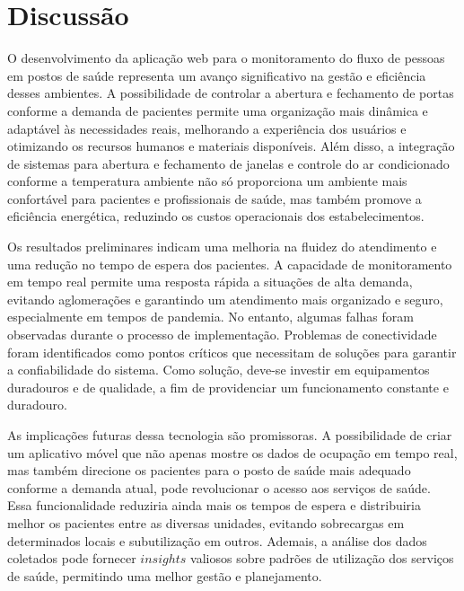 \documentclass[conference, a4paper, 12pt]{IEEEtran}
\begin{document}
\section{Discussão}
\label{sec:discussion}
  O desenvolvimento da aplicação web para o monitoramento do fluxo de pessoas em postos de saúde representa um avanço significativo na gestão e eficiência desses ambientes. A possibilidade de controlar a abertura e fechamento de portas conforme a demanda de pacientes permite uma organização mais dinâmica e adaptável às necessidades reais, melhorando a experiência dos usuários e otimizando os recursos humanos e materiais disponíveis. Além disso, a integração de sistemas para abertura e fechamento de janelas e controle do ar condicionado conforme a temperatura ambiente não só proporciona um ambiente mais confortável para pacientes e profissionais de saúde, mas também promove a eficiência energética, reduzindo os custos operacionais dos estabelecimentos.

  Os resultados preliminares indicam uma melhoria na fluidez do atendimento e uma redução no tempo de espera dos pacientes. A capacidade de monitoramento em tempo real permite uma resposta rápida a situações de alta demanda, evitando aglomerações e garantindo um atendimento mais organizado e seguro, especialmente em tempos de pandemia. No entanto, algumas falhas foram observadas durante o processo de implementação. Problemas de conectividade foram identificados como pontos críticos que necessitam de soluções para garantir a confiabilidade do sistema. Como solução, deve-se investir em equipamentos duradouros e de qualidade, a fim de providenciar um funcionamento constante e duradouro.

  As implicações futuras dessa tecnologia são promissoras. A possibilidade de criar um aplicativo móvel que não apenas mostre os dados de ocupação em tempo real, mas também direcione os pacientes para o posto de saúde mais adequado conforme a demanda atual, pode revolucionar o acesso aos serviços de saúde. Essa funcionalidade reduziria ainda mais os tempos de espera e distribuiria melhor os pacientes entre as diversas unidades, evitando sobrecargas em determinados locais e subutilização em outros. Ademais, a análise dos dados coletados pode fornecer $insights$ valiosos sobre padrões de utilização dos serviços de saúde, permitindo uma melhor gestão e planejamento. 
\end{document}
